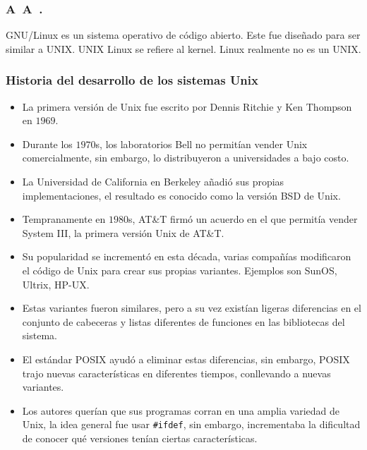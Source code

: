 




\begin{frame}
	\frametitle{A~\gnu{}A~\linux{}.}
	GNU/Linux es un sistema operativo de código abierto. Este fue diseñado para ser similar a UNIX.
	UNIX
	Linux se refiere al kernel.
	Linux realmente no es un UNIX.
\end{frame}

\begin{frame}

	\frametitle{Historia del desarrollo de los sistemas Unix}

	\begin{itemize}
		\item
		      La primera versión de Unix fue escrito por Dennis Ritchie y Ken Thompson en $1969$.
		\item
		      Durante los $1970$s, los laboratorios Bell no permitían vender Unix comercialmente, sin embargo, lo distribuyeron a universidades a bajo costo.
		\item
		      La Universidad de California en Berkeley añadió sus propias implementaciones, el resultado es conocido como la versión BSD de Unix.
		\item
		      Tempranamente en $1980$s, AT\&T firmó un acuerdo en el que permitía vender System III, la primera versión Unix de AT\&T.
		\item
		      Su popularidad se incrementó en esta década, varias compañías modificaron el código de Unix para crear sus propias variantes. Ejemplos son SunOS, Ultrix, HP-UX.
		\item
		      Estas variantes fueron similares, pero a su vez existían ligeras diferencias en el conjunto de cabeceras y listas diferentes de funciones en las bibliotecas del sistema.
		\item
		      El estándar POSIX ayudó a eliminar estas diferencias, sin embargo, POSIX trajo nuevas características en diferentes tiempos, conllevando a nuevas variantes.
		\item Los autores querían que sus programas corran en una amplia variedad de Unix, la idea general fue usar \texttt{\#ifdef}, sin embargo, incrementaba la dificultad de conocer qué versiones tenían ciertas características.
	\end{itemize}
\end{frame}

